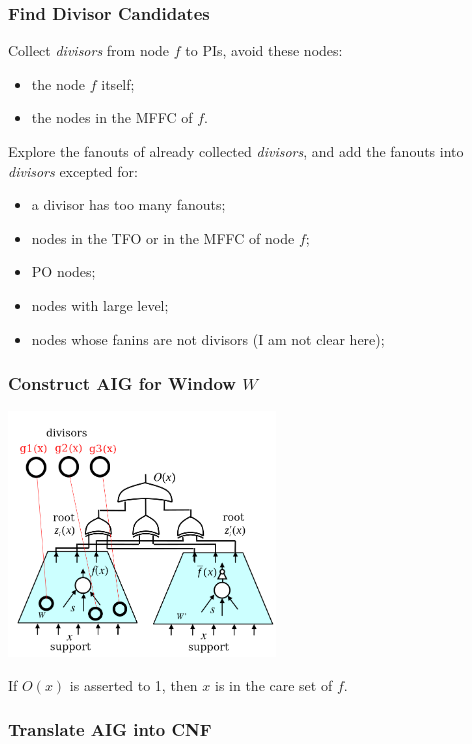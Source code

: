 \documentclass{article}
\begin{document}
\subsubsection{Find Divisor Candidates}
Collect \textit{divisors} from node $f$ to PIs,
avoid these nodes:
\begin{itemize}
    \item the node $f$ itself;
    \item the nodes in the MFFC of $f$.
\end{itemize}
Explore the fanouts of already collected \textit{divisors},
and add the fanouts into \textit{divisors} excepted for:
\begin{itemize}
    \item a divisor has too many fanouts;
    \item nodes in the TFO or in the MFFC of node $f$;
    \item PO nodes;
    \item nodes with large level;
    \item nodes whose fanins are not divisors (I am not clear here);
\end{itemize}

\subsubsection{Construct AIG for Window $W$}
\begin{center}
\includegraphics[height=6.5cm]{./aig.png}
\end{center}
If $O(x)$ is asserted to 1,
then $x$ is in the care set of $f$.

\subsubsection{Translate AIG into CNF}
\end{document}
